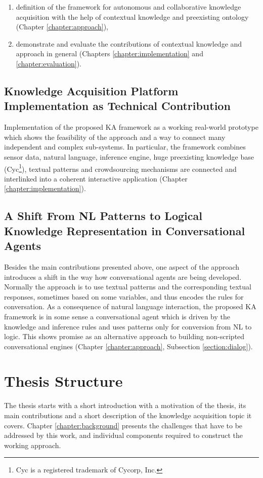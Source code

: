 \begin{enumerate}
\item definition of the framework for autonomous and collaborative knowledge 
acquisition with the help of contextual knowledge and preexisting ontology 
(Chapter \ref{chapter:approach}), 
\item demonstrate and evaluate the contributions of contextual knowledge and 
approach in general (Chapters \ref{chapter:implementation} and 
\ref{chapter:evaluation}).
\end{enumerate}

\subsection{Knowledge Acquisition Platform Implementation as Technical 
Contribution }
Implementation of the proposed KA framework as a working real-world prototype
which shows the feasibility of the approach and a way to connect many
independent and complex sub-systems. In particular, the framework combines
sensor data, natural language, inference engine, huge preexisting knowledge
base (Cyc\footnote{Cyc is a registered
trademark of Cycorp, Inc.}), textual patterns 
and crowdsourcing mechanisms are connected and interlinked into a coherent 
interactive application (Chapter \ref{chapter:implementation}).

\subsection{A Shift From NL Patterns to Logical Knowledge Representation in 
Conversational Agents}
Besides the main contributions presented above, one aspect of the approach 
introduces a shift in the way how conversational agents are being developed. 
Normally the approach is to use textual patterns and the corresponding textual 
responses, sometimes based on some variables, and thus encodes the rules for 
conversation. As a consequence of natural language interaction, the proposed 
KA framework is in some sense a conversational agent which is driven by the 
knowledge and inference rules and uses patterns only for conversion from 
NL to logic. This shows promise as an alternative approach to building non-scripted conversational engines (Chapter \ref{chapter:approach}, Subsection
\ref{section:dialog}).

\section{Thesis Structure}
The thesis starts with a short introduction with a motivation of the thesis,
its main contributions and a short description of the knowledge acquisition topic
it covers. Chapter \ref{chapter:background} presents the challenges that have
to be addressed by this work, and individual components required to construct
the working approach.

